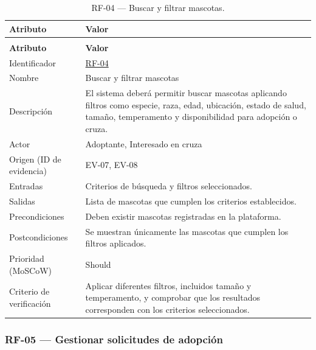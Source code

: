 \documentclass[journal,onecolumn]{IEEEtran}
\makeatletter
\newenvironment{atributos}[2]{%
	\small
	\begin{longtable}{@{}>{\raggedright\arraybackslash}p{4.2cm} >{\raggedright\arraybackslash}p{11.2cm}@{}}
		\caption{#2}\label{tab:#1}\\
		\toprule
		\textbf{Atributo} & \textbf{Valor} \\
		\midrule
		\endfirsthead
		\multicolumn{2}{@{}l}{\small\itshape (continuación)}\\
		\toprule
		\textbf{Atributo} & \textbf{Valor} \\
		\midrule
		\endhead
		\bottomrule
		\endlastfoot
	}{%
	\end{longtable}
	\normalsize
}
\makeatother
\begin{document}
	\begin{atributos}{RF-04}{RF-04 --- Buscar y filtrar mascotas.}
		Identificador & \hyperref[tab:RF-04]{RF-04} \\
		Nombre & Buscar y filtrar mascotas \\
		Descripción & El sistema deberá permitir buscar mascotas aplicando filtros como especie, raza, edad, ubicación, estado de salud, tamaño, temperamento y disponibilidad para adopción o cruza. \\
		Actor & Adoptante, Interesado en cruza \\
		Origen (ID de evidencia) & EV-07, EV-08 \\
		Entradas & Criterios de búsqueda y filtros seleccionados. \\
		Salidas & Lista de mascotas que cumplen los criterios establecidos. \\
		Precondiciones & Deben existir mascotas registradas en la plataforma. \\
		Postcondiciones & Se muestran únicamente las mascotas que cumplen los filtros aplicados. \\
		Prioridad (MoSCoW) & Should \\
		Criterio de verificación & Aplicar diferentes filtros, incluidos tamaño y temperamento, y comprobar que los resultados corresponden con los criterios seleccionados. \\
	\end{atributos}
	
	\subsubsection{RF-05 --- Gestionar solicitudes de adopción}
	
\end{document}

